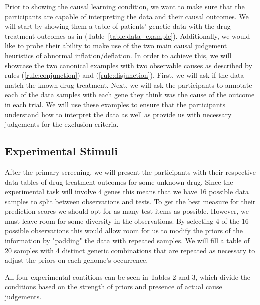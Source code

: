 \documentclass[10pt,letterpaper]{article}
\begin{document}
Prior to showing the causal learning condition, we want to make sure that the participants are capable of interpreting the data and their causal outcomes.
We will start by showing them a table of patients' genetic data with the drug treatment outcomes as in (Table~\ref{table:data_example}).
Additionally, we would like to probe their ability to make use of the two main causal judgement heuristics of abnormal inflation/deflation. In order to achieve this, we will showcase the two canonical examples with two observable causes as described by rules (\ref{rule:conjunction}) and (\ref{rule:disjunction}).
First, we will ask if the data match the known drug treatment.
Next, we will ask the participants to annotate each of the data samples with each gene they think was the cause of the outcome in each trial.
We will use these examples to ensure that the participants understand how to interpret the data as well as provide us with necessary judgements for the exclusion criteria.

\newpage

\subsection*{Experimental Stimuli}

After the primary screening, we will present the participants with their respective data tables of drug treatment outcomes for some unknown drug.
Since the experimental task will involve 4 genes this means that we have 16 possible data samples to split between observations and tests. 
To get the best measure for their prediction scores we should opt for as many test items as possible. 
However, we must leave room for some diversity in the observations.
By selecting 4 of the 16 possible observations this would allow room for us to modify the priors of the information by "padding" the data with repeated samples. 
We will fill a table of 20 samples with 4 distinct genetic combinations that are repeated as necessary to adjust the priors on each genome's occurrence.

All four experimental contitions can be seen in Tables 2 and 3, which divide the conditions based on the strength of priors and presence of actual cause judgements.
\end{document}
